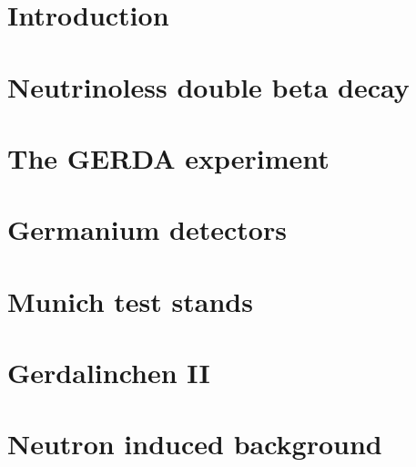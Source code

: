 \documentclass[11pt,a4paper]{book}
\begin{document}
\pagestyle{empty}



\cleardoublepage



\cleardoublepage \setcounter{page}{1} 

\tableofcontents

\cleardoublepage \setcounter{page}{1} 

\pagestyle{fancy}

\chapter{Introduction}
\label{cha:intro}

\clearpage{\pagestyle{empty}\cleardoublepage}

\chapter{Neutrinoless double beta decay}
\label{cha:theory}

\clearpage{\pagestyle{empty}\cleardoublepage}

\chapter{The GERDA experiment}
\label{cha:gerda}

\clearpage{\pagestyle{empty}\cleardoublepage}

\chapter{Germanium detectors}
\label{cha:detector}

\clearpage{\pagestyle{empty}\cleardoublepage}

\chapter{Munich test stands}
\label{cha:teststand}

\clearpage{\pagestyle{empty}\cleardoublepage}

\chapter{Gerdalinchen II}
\label{cha:gerdalinchenII}

\clearpage{\pagestyle{empty}\cleardoublepage}

\chapter{Neutron induced background}
\label{cha:neutron}

\end{document}

